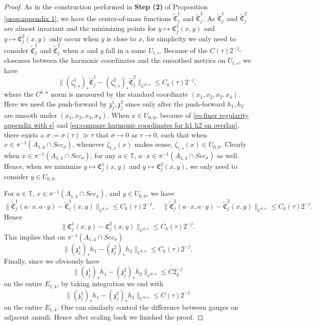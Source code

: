 \documentclass[a4paper,11pt]{amsart}
\theoremstyle{definition}
\numberwithin{equation}{section}
\begin{document}
\begin{proof}
    As in the construction performed in \textbf{Step (2)} of Proposition \ref{prop:appendix 1}, we have the center-of-mass functions $\widetilde{\mathfrak{C}}_j^1$ and $\widetilde{\mathfrak{C}}_j^2$. As $\widetilde{\mathfrak{C}}_j^1$ and $\widetilde{\mathfrak{C}}_j^2$ are almost invariant and the minimizing points for $y\mapsto{\mathfrak{C}}_j^1(x,y)$ and $y\mapsto{\mathfrak{C}}_j^2(x,y)$ only occur when $y$ is close to $x$, for simplicity we only need to consider $\widetilde{\mathfrak{C}}_j^1$ and $\widetilde{\mathfrak{C}}_j^2$ when $x$ and $y$ fall in a same $U_{t,s}$. Because of the $C(\tau)2^{-j}$-closeness between the harmonic coordinates and the smoothed metrics on $U_{t,s}$, we have 
    $$\|(\zeta_{t,s}^1)_*\widetilde{\mathfrak{C}}_j^1-(\zeta_{t,s}^2)_*\widetilde{\mathfrak{C}}_j^2\|_{C^{k,\alpha}}\leq C_k(\tau)2^{-j},$$
    where the $C^{k,\alpha}$ norm is measured by the standard coordinate $(x_1,x_2,x_3,x_4)$. Here we need the push-forward by $\mathfrak{z}_j^1,\mathfrak{z}_j^2$ since only after the push-forward $h_1,h_2$ are smooth under $(x_1,x_2,x_3,x_4)$. When $x\in U_{0,0}$, because of \eqref{eq:finer regularity appendix with e} and \eqref{eq:compare harmonic coordinates for h1 h2 on overlap},  there exists a $\sigma:=\sigma(\tau)\gg\tau$ that $\sigma\to0$ as $\tau\to0$, such that when $x\in\pi^{-1}(A_{1,4}\cap Sec_\sigma)$, whenever $\zeta_{t,s}(x)$ makes sense, $\zeta_{t,s}(x)\in U_{0,0}$. Clearly when $x\in\pi^{-1}(A_{1,4}\cap Sec_\sigma)$, for any $a\in\mathbb{T}$, $a\cdot x\in\pi^{-1}(A_{1,4}\cap Sec_\sigma)$ as well. Hence, when we minimize $y\mapsto\mathfrak{C}_j^1(x,y)$ and $y\mapsto\mathfrak{C}_j^2(x,y)$, we only need to consider $y\in U_{0,0}$.



    For $a\in\mathbb{T}$, $x\in\pi^{-1}(A_{1,4}\cap Sec_\sigma)$, and $y\in U_{0,0}$, we have 
    $$\|\widetilde{\mathfrak{C}}_j^1(a\cdot x,a\cdot y)-\widetilde{\mathfrak{C}}_j^1(x,y)\|_{C^{k,\alpha}}\leq C_k(\tau)2^{-j},\quad \|\widetilde{\mathfrak{C}}_j^2(a\cdot x,a\cdot y)-\widetilde{\mathfrak{C}}_j^2(x,y)\|_{C^{k,\alpha}}\leq C_k(\tau)2^{-j}.$$
    Hence $$\|\mathfrak{C}^1_j(x,y)-\mathfrak{C}^2_j(x,y)\|_{C^{k,\alpha}}\leq C_k(\tau)2^{-j}.$$ This implies that on $\pi^{-1}(A_{1,4}\cap Sec_\sigma)$
    $$\|(\mathfrak{z}_j^1)_*h_1-(\mathfrak{z}_j^2)_*h_2\|_{C^{k,\alpha}}\leq C_k(\tau)2^{-j}.$$
    Finally, since we obviously have $$\|(\mathfrak{z}_j^1)_*h_1-(\mathfrak{z}_j^2)_*h_2\|_{C^{k,\alpha}}\leq C2_k^{-j}$$ on the entire $E_{1,4}$, by taking integration we end with $$\|(\mathfrak{z}_j^1)_*h_1-(\mathfrak{z}_j^2)_*h_2\|_{C^{k,\alpha}}\leq C(\tau)2^{-j}$$ on the entire $E_{1,4}$. One can similarly control the difference between gauges on adjacent annuli. Hence after scaling back we finished the proof.
\end{proof}
\end{document}
